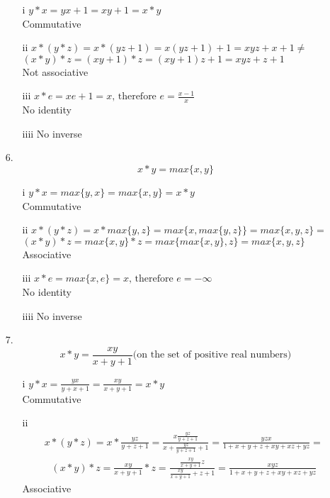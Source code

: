 \begin{enumerate}
\begin{enumerate}
\item[i]
$y*x=yx+1=xy+1=x*y$ \\
Commutative

\item[ii]
$x*(y*z)=x*(yz+1)=x(yz+1)+1=xyz+x+1 \neq$ \\
$(x*y)*z=(xy+1)*z=(xy+1)z+1=xyz+z+1$ \\
Not associative

\item[iii]
$x*e=xe+1=x \text{, therefore } e=\frac{x-1}{x}$ \\
No identity

\item[iiii]
No inverse

\end{enumerate}

\item[6.]
\begin{equation}
x*y=max\{x,y\}
\end{equation}

\begin{enumerate}

\item[i]
$y*x=max\{y,x\}=max\{x,y\}=x*y$ \\
Commutative

\item[ii]
$x*(y*z)=x*max\{y,z\}=max\{x,max\{y,z\}\}=max\{x,y,z\}=$ \\
$(x*y)*z=max\{x,y\}*z=max\{max\{x,y\},z\}=max\{x,y,z\}$ \\
Associative

\item[iii]
$x*e=max\{x,e\}=x \text{, therefore } e=-\infty$ \\
No identity

\item[iiii]
No inverse

\end{enumerate}

\item[7.]
\begin{equation}
x*y=\frac{xy}{x+y+1} \text{(on the set of positive real numbers)}
\end{equation}

\begin{enumerate}

\item[i]
$y*x=\frac{yx}{y+x+1}=\frac{xy}{x+y+1}=x*y$ \\
Commutative

\item[ii]
\begin{multline}
x*(y*z)=x*\frac{yz}{y+z+1}=\frac{x\frac{yz}{y+z+1}}{x+\frac{yz}{y+z+1}+1}
= \frac{y z x}{1 + x + y + z + x y + x z + y z} =
\end{multline}
\begin{multline}
(x*y)*z=\frac{xy}{x+y+1}*z=\frac{\frac{xy}{x+y+1}z}{\frac{xy}{x+y+1}+z+1}
=\frac{x y z}{1 + x +y + z + x y + x z + y z}
\end{multline}
Associative


\end{enumerate}
\end{enumerate}
